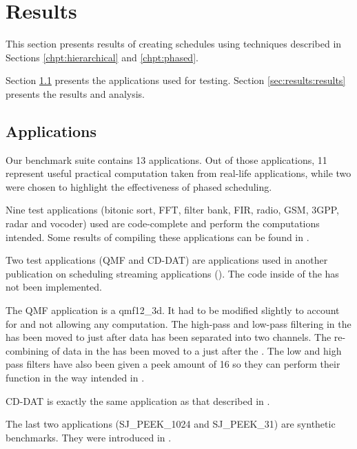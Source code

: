\section{Results}
\label{chpt:results}

This section presents results of creating schedules using
techniques described in Sections \ref{chpt:hierarchical} and
\ref{chpt:phased}.

Section \ref{sec:results:apps} presents the applications used for
testing.  Section \ref{sec:results:results} presents the results and
analysis.

\subsection{Applications}
\label{sec:results:apps}

Our benchmark suite contains 13 applications. Out of those
applications, 11 represent useful practical computation taken from
real-life applications, while two were chosen to highlight the
effectiveness of phased scheduling.

Nine test applications (bitonic sort, FFT, filter bank, FIR,
radio, GSM, 3GPP, radar and vocoder) used are code-complete and
perform the computations intended. Some results of compiling these
applications can be found in \cite{Gordo02}.

Two test applications (QMF and CD-DAT) are applications used in
another publication on scheduling streaming applications
(\cite{murthy99buffer}). The code inside of the {\filters} has not
been implemented.

The QMF application is a qmf12\_3d.  It had to be modified
slightly to account for {\StreamIt} {\splitters} and {\joiners}
not allowing any computation. The high-pass and low-pass filtering
in the {\splitters} has been moved to just after data has been
separated into two channels. The re-combining of data in the
{\joiners} has been moved to a {\filter} just after the
{\joiners}. The low and high pass filters have also been given a
peek amount of 16 so they can perform their function in the way
intended in {\StreamIt}.

CD-DAT is exactly the same application as that described in
\cite{murthy99buffer}.

The last two applications (SJ\_PEEK\_1024 and SJ\_PEEK\_31) are
synthetic benchmarks. They were introduced in
\cite{karczma-thesis}.

